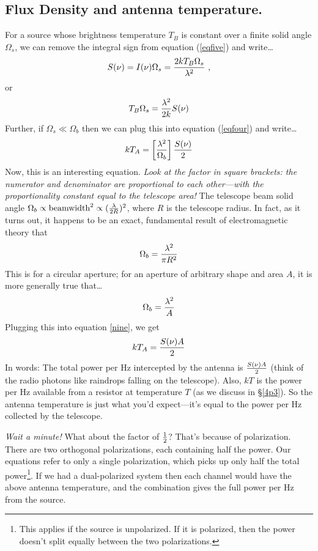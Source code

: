 \documentclass[12pt,psfig,preprint]{aastex}
\begin{document}
	\subsection{Flux Density and antenna temperature.} 

	For a source whose brightness temperature $T_B$ is constant over
a finite solid angle $\Omega_s$, we can remove the integral sign from
equation (\ref{eqfive}) and write\dots
%
\begin{equation} S(\nu) = I(\nu) \Omega_s = {2 k T_B \Omega_s \over
\lambda^2} \ ,
\end{equation}
%
\noindent or
%
\begin{equation} T_B \Omega_s = {\lambda^2 \over 2k} S(\nu) 
\end{equation}
%
Further, if $\Omega_s \ll \Omega_b$ then we can plug this into equation
(\ref{eqfour}) and write\dots
%
\begin{equation} \label{nine}
k T_A = \left[ {\lambda^2 \over \Omega_b} \right] {S(\nu) \over 2} 
\end{equation}
%
	Now, this is an interesting equation.  {\it Look at the factor
in square brackets: the numerator and denominator are proportional to
each other---with the proportionality constant equal to the telescope
area!} The telescope beam solid angle $\Omega_b \propto {\rm
beamwidth}^2 \propto ({\lambda \over 2R})^2$, where $R$ is the telescope
radius.  In fact, as it turns out, it happens to be an exact,
fundamental result of electromagnetic theory that
%
\begin{equation} \Omega_b =  {\lambda^2 \over \pi R^2} 
\end{equation}
%
\noindent This is for a circular aperture; for an aperture of arbitrary
shape and area $A$, it is more generally true that\dots
%
\begin{equation} \Omega_b =  {\lambda^2 \over A} 
\end{equation}
%
\noindent Plugging this into equation \ref{nine}, we get
%
\begin{equation} k T_A = {S(\nu) A \over 2} 
\end{equation}
%
\noindent In words: The total power per Hz intercepted by the antenna is
${S(\nu) A \over 2}$ (think of the radio photons like raindrops falling
on the telescope).  Also, $kT$ is the power per Hz available from a
resistor at temperature $T$ (as we discuss in \S \ref{4p3}).  So the
antenna temperature is just what you'd expect---it's equal to the power
per Hz collected by the telescope. 

	{\it Wait a minute!} What about the factor of $1 \over 2$? That's
because of polarization.  There are two orthogonal polarizations, each
containing half the power.  Our equations refer to only a single
polarization, which picks up only half the total power\footnote{This
applies if the source is unpolarized. If it is polarized, then the power
doesn't split equally between the two polarizations.}.  If we had a
dual-polarized system then each channel would have the above antenna
temperature, and the combination gives the full power per Hz from the
source. 
\end{document}

